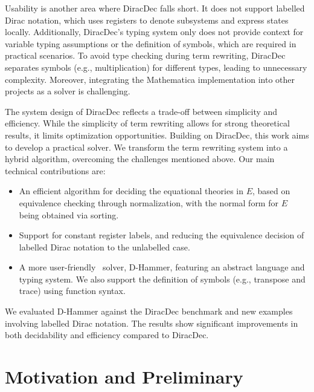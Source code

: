 Usability is another area where DiracDec falls short. It does not support labelled Dirac notation, which uses registers to denote subsystems and express states locally. Additionally, DiracDec's typing system only does not provide context for variable typing assumptions or the definition of symbols, which are required in practical scenarios. To avoid type checking during term rewriting, DiracDec separates symbols (e.g., multiplication) for different types, leading to unnecessary complexity. Moreover, integrating the Mathematica implementation into other projects as a solver is challenging.

The system design of DiracDec reflects a trade-off between simplicity and efficiency. While the simplicity of term rewriting allows for strong theoretical results, it limits optimization opportunities. Building on DiracDec, this work aims to develop a practical solver. We transform the term rewriting system into a hybrid algorithm, overcoming the challenges mentioned above. Our main technical contributions are:
\begin{itemize}
    \item An efficient algorithm for deciding the equational theories in \( E \), based on equivalence checking through normalization, with the normal form for \( E \) being obtained via sorting.
    \item Support for constant register labels, and reducing the equivalence decision of labelled Dirac notation to the unlabelled case.
    \item A more user-friendly \CC\ solver, D-Hammer, featuring an abstract language and typing system. We also support the definition of symbols (e.g., transpose and trace) using function syntax.
\end{itemize}

We evaluated D-Hammer against the DiracDec benchmark and new examples involving labelled Dirac notation. The results show significant improvements in both decidability and efficiency compared to DiracDec.



\section{Motivation and Preliminary}


